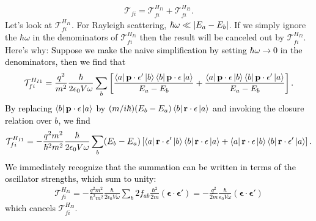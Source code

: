 \documentclass{article}
\theoremstyle{definition}
\newcommand{\f}[2]{\frac{#1}{#2}}
\newcommand{\lb}{\left[}
\newcommand{\rb}{\right]}
\begin{document}
\begin{enumerate}[label=(\alph*)]
\begin{align*}
\mathcal{T}_{fi} = \mathcal{T}_{fi}^{H_{I1}}  + \mathcal{T}_{fi}^{H_{I2}}.
\end{align*}
Let's look at $\mathcal{T}_{fi}^{H_{I1}}$. For Rayleigh scattering, $\hbar \omega \ll \abs{E_a - E_b}$. If we simply ignore the $\hbar \omega$ in the denominators of $\mathcal{T}_{fi}^{H_{I1}}$ then the result will be canceled out by $\mathcal{T}_{fi}^{H_{I2}}$. Here's why: \textcolor{black}{Suppose we make the naive simplification by setting $\hbar \omega \to 0$ in the denominators, then we find that
\begin{align*}
 \mathcal{T}_{fi}^{H_{I1}} = \f{q^2}{m^2} \f{\hbar }{2\epsilon_0 V \omega} 
 \sum_b
 \lb 
 \f{\bra{a} \mathbf{p}\cdot \mathbf{\epsilon'}  \ket{b} \bra{b}  \mathbf{p}\cdot \mathbf{\epsilon} \ket{a}}{E_a  - E_b}
 +
 \f{\bra{a}  \mathbf{p}\cdot \mathbf{\epsilon} \ket{b}\bra{b}  \mathbf{p}\cdot \mathbf{\epsilon'}  \ket{a}}{E_a - E_b}
 \rb.
 \end{align*}
 By replacing $\bra{b} \mathbf{p}\cdot \mathbf{\epsilon} \ket{a}$ by $(m/i\hbar) (E_b - E_a) \bra{b}  \mathbf{r}\cdot \mathbf{\epsilon}  \ket{a} $ and invoking the closure relation over $b$, we find 
\begin{align*}
 \mathcal{T}_{fi}^{H_{I1}} = -\f{q^2 m^2}{\hbar^2 m^2} \f{\hbar }{2\epsilon_0 V \omega} 
\sum_b (E_b - E_a)
 \lb 
 \bra{a} \mathbf{r}\cdot \mathbf{\epsilon'}  \ket{b} \bra{b}  \mathbf{r}\cdot \mathbf{\epsilon} \ket{a}
 +
\bra{a}  \mathbf{r}\cdot \mathbf{\epsilon} \ket{b}\bra{b}  \mathbf{r}\cdot \mathbf{\epsilon'}  \ket{a} \rb.
\end{align*}
We immediately recognize that the summation can be written in terms of the oscillator strengths, which sum to unity:
\begin{align*}
 \mathcal{T}_{fi}^{H_{I1}} = -\f{q^2 m^2}{\hbar^2 m^2} \f{\hbar }{2\epsilon_0 V \omega} 
\sum_b  2 f_{ab} \f{\hbar^2}{2m} (\mathbf{\epsilon}\cdot \mathbf{\epsilon'}) =  -\f{q^2}{2m} \f{\hbar}{\epsilon_0 V \omega} (\mathbf{\epsilon}\cdot \mathbf{\epsilon'}) 
\end{align*}
which cancels $\mathcal{T}_{fi}^{H_{I2}}$. 
}


\end{enumerate}
\end{document}
